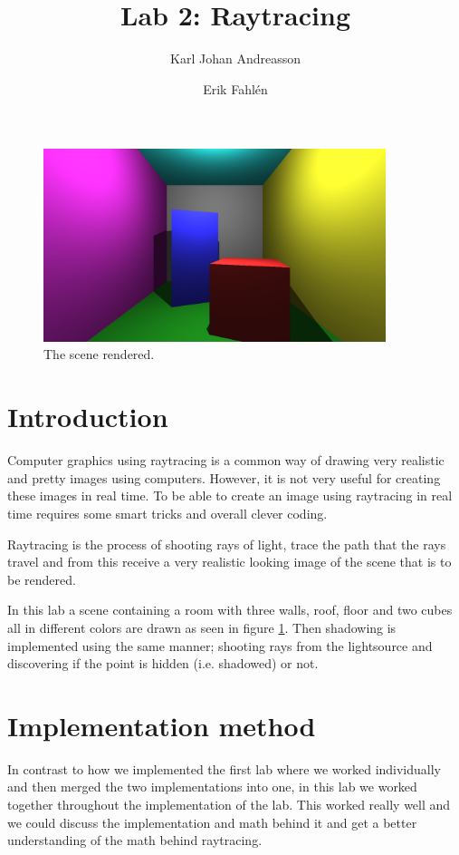 \documentclass[a4paper]{article}
\begin{document}
\title{Lab 2: Raytracing}

\author{Karl Johan Andreasson \and Erik Fahlén}

\maketitle

\begin{figure}[H]
    \centering
    \includegraphics[width=10cm]{main720.png}
    \caption{The scene rendered.}
    \label{fig:main}
\end{figure}

\section{Introduction}
Computer graphics using raytracing is a common way of drawing very realistic and
pretty images using computers. However, it is not very useful for creating these
images in real time. To be able to create an image using raytracing in real time
requires some smart tricks and overall clever coding.

Raytracing is the process of shooting rays of light, trace the path that the rays
travel and from this receive a very realistic looking image of the scene that is
to be rendered.

In this lab a scene containing a room with three walls, roof, floor and two
cubes all in different colors are drawn as seen in figure \ref{fig:main}. Then shadowing
is implemented using the same manner; shooting rays from the lightsource and
discovering if the point is hidden (i.e. shadowed) or not.


\section{Implementation method}
In contrast to how we implemented the first lab where we worked individually and
then merged the two implementations into one, in this lab we worked together
throughout the implementation of the lab. This worked really well and we could
discuss the implementation and math behind it and get a better understanding of
the math behind raytracing.
\end{document}
